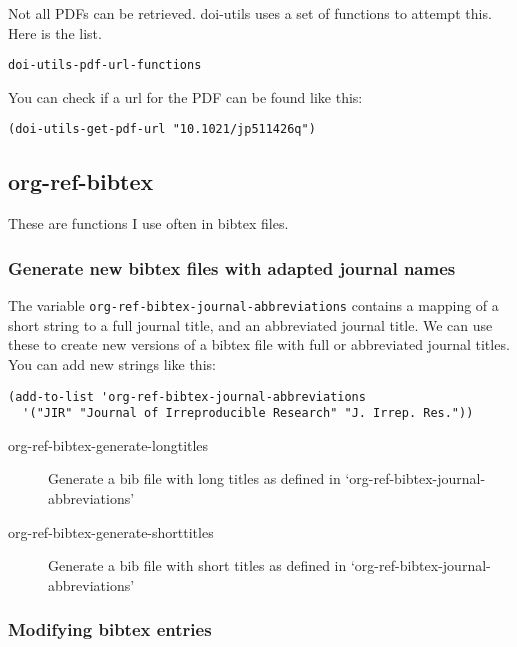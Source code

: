 \documentclass[11pt]{article}
\begin{document}
Not all PDFs can be retrieved. doi-utils uses a set of functions to attempt this. Here is the list.

\begin{verbatim}
doi-utils-pdf-url-functions
\end{verbatim}

You can check if a url for the PDF can be found like this:
\begin{verbatim}
(doi-utils-get-pdf-url "10.1021/jp511426q")
\end{verbatim}

\subsection{org-ref-bibtex}
\label{sec:org8678767}
These are functions I use often in bibtex files.

\subsubsection{Generate new bibtex files with adapted journal names}
\label{sec:orga3a9825}

The variable \texttt{org-ref-bibtex-journal-abbreviations} contains a mapping of a short string to a full journal title, and an abbreviated journal title. We can use these to create new versions of a bibtex file with full or abbreviated journal titles. You can add new strings like this:

\begin{verbatim}
(add-to-list 'org-ref-bibtex-journal-abbreviations
  '("JIR" "Journal of Irreproducible Research" "J. Irrep. Res."))
\end{verbatim}

\begin{description}
\item[{org-ref-bibtex-generate-longtitles}] Generate a bib file with long titles as
defined in `org-ref-bibtex-journal-abbreviations'
\item[{org-ref-bibtex-generate-shorttitles}] Generate a bib file with short titles as
defined in `org-ref-bibtex-journal-abbreviations'
\end{description}

\subsubsection{Modifying bibtex entries}
\label{sec:orge9bfb92}
\end{document}
